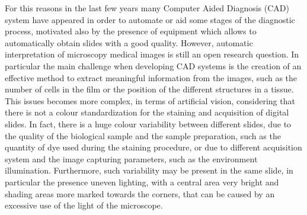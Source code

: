\documentclass[final,a4paper,12pt,english]{UnicaPhdThesis3}
\begin{document}
For this reasons in the last few years many Computer Aided Diagnosis (\acs{CAD}) system have appeared in order to automate or aid some stages of the diagnostic process, motivated also by the presence of equipment which allows to automatically obtain slides with a good quality. However, automatic interpretation of microscopy medical images is still an open research question. In particular the main challenge when developing CAD systems is the creation of an effective method to extract meaningful information from the images, such as the number of cells in the film or the position of the different structures in a tissue. This issues becomes more complex, in terms of artificial vision,  considering that there is not a colour standardization for the staining and acquisition of digital slides. In fact, there is a huge colour variability between different slides, due to the quality of the biological sample and the sample preparation, such as the quantity of dye used during the staining procedure, or due to different acquisition system and the image capturing parameters, such as the environment illumination. Furthermore, such variability may be present in the same slide, in particular the presence  
uneven lighting, with a central area very bright and shading areas more marked towards the corners, that can be caused by an excessive use of the light of the microscope.
\end{document}
